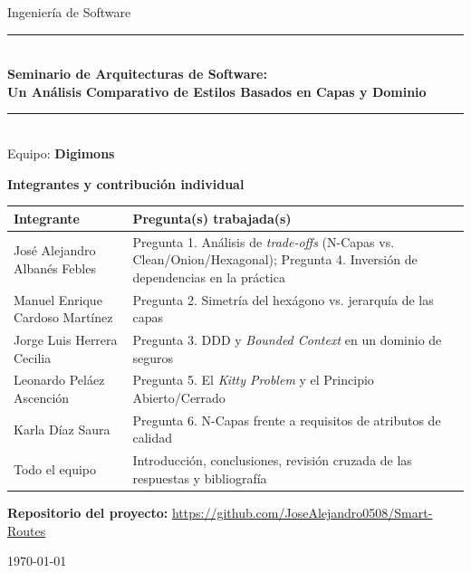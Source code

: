 \documentclass[11pt,a4paper]{article}
\newcommand{\NombreEquipo}{Digimons}
\newcommand{\IntegranteA}{José Alejandro Albanés Febles}
\newcommand{\IntegranteB}{Manuel Enrique Cardoso Martínez}
\newcommand{\IntegranteC}{Jorge Luis Herrera Cecilia}
\newcommand{\IntegranteD}{Leonardo Peláez Ascención}
\newcommand{\IntegranteE}{Karla Díaz Saura}
\newcommand{\Repositorio}{https://github.com/JoseAlejandro0508/Smart-Routes}
\begin{document}
\begin{titlepage}
\thispagestyle{empty}
\begin{center}
{\large Ingeniería de Software}\\[2.5cm]

{\color{azul}\rule{\textwidth}{1.2pt}}\\[0.4cm]
{\LARGE\bfseries Seminario de Arquitecturas de Software:\\[0.2cm]
Un Análisis Comparativo de Estilos Basados en Capas y Dominio}\\[0.3cm]
{\color{azul}\rule{\textwidth}{1.2pt}}\\[1.5cm]

{\Large Equipo: \textbf{\NombreEquipo}}\\[1.5cm]
\end{center}

\noindent\textbf{Integrantes y contribución individual}\\[0.3cm]
\renewcommand{\arraystretch}{1.4}
\begin{tabularx}{\textwidth}{>{\raggedright\arraybackslash}X >{\raggedright\arraybackslash}X}
\toprule
\textbf{Integrante} & \textbf{Pregunta(s) trabajada(s)} \\
\midrule
\IntegranteA & Pregunta 1. Análisis de \emph{trade-offs} (N-Capas vs. Clean/Onion/Hexagonal); Pregunta 4. Inversión de dependencias en la práctica \\
\IntegranteB & Pregunta 2. Simetría del hexágono vs. jerarquía de las capas \\
\IntegranteC & Pregunta 3. DDD y \emph{Bounded Context} en un dominio de seguros \\
\IntegranteD & Pregunta 5. El \emph{Kitty Problem} y el Principio Abierto/Cerrado \\
\IntegranteE & Pregunta 6. N-Capas frente a requisitos de atributos de calidad \\
\midrule
Todo el equipo & Introducción, conclusiones, revisión cruzada de las respuestas y bibliografía \\
\bottomrule
\end{tabularx}

\vfill
\noindent\textbf{Repositorio del proyecto:} \url{\Repositorio}

\vspace{1cm}
\begin{center}
\today
\end{center}
\end{titlepage}
\end{document}
